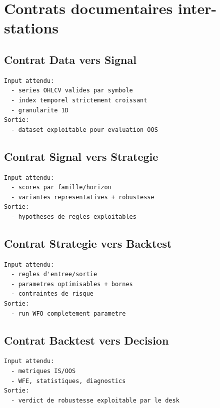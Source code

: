 \chapter{Contrats documentaires inter-stations}

\section{Contrat Data vers Signal}
\begin{verbatim}
Input attendu:
  - series OHLCV valides par symbole
  - index temporel strictement croissant
  - granularite 1D
Sortie:
  - dataset exploitable pour evaluation OOS
\end{verbatim}

\section{Contrat Signal vers Strategie}
\begin{verbatim}
Input attendu:
  - scores par famille/horizon
  - variantes representatives + robustesse
Sortie:
  - hypotheses de regles exploitables
\end{verbatim}

\section{Contrat Strategie vers Backtest}
\begin{verbatim}
Input attendu:
  - regles d'entree/sortie
  - parametres optimisables + bornes
  - contraintes de risque
Sortie:
  - run WFO completement parametre
\end{verbatim}

\section{Contrat Backtest vers Decision}
\begin{verbatim}
Input attendu:
  - metriques IS/OOS
  - WFE, statistiques, diagnostics
Sortie:
  - verdict de robustesse exploitable par le desk
\end{verbatim}

